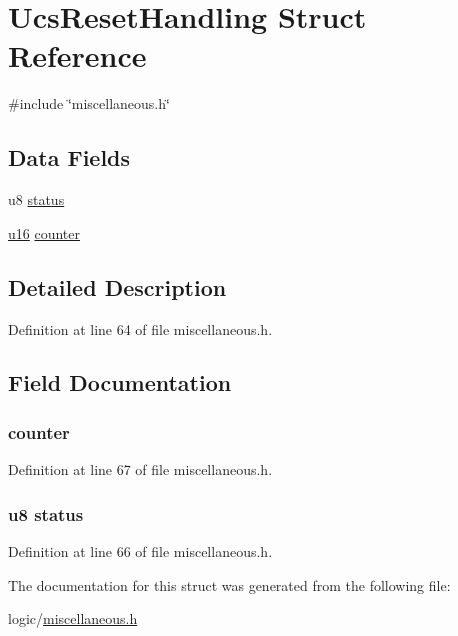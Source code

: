 \hypertarget{structUcsResetHandling}{\section{\-Ucs\-Reset\-Handling \-Struct \-Reference}
\label{structUcsResetHandling}
}


{\ttfamily \#include \char`\"{}miscellaneous.\-h\char`\"{}}

\subsection*{\-Data \-Fields}
\begin{DoxyCompactItemize}
\item 
u8 \hyperlink{structUcsResetHandling_aa648386576736be0dd25c95b6edd37d2}{status}
\item 
\hyperlink{main__ED__BM_8c_a9e6c91d77e24643b888dbd1a1a590054}{u16} \hyperlink{structUcsResetHandling_ad00d8d1e3945b2409706acf4fb49f3c1}{counter}
\end{DoxyCompactItemize}


\subsection{\-Detailed \-Description}


\-Definition at line 64 of file miscellaneous.\-h.



\subsection{\-Field \-Documentation}
\hypertarget{structUcsResetHandling_ad00d8d1e3945b2409706acf4fb49f3c1}{
\subsubsection[{counter}]{ {\bf counter}}}\label{structUcsResetHandling_ad00d8d1e3945b2409706acf4fb49f3c1}


\-Definition at line 67 of file miscellaneous.\-h.

\hypertarget{structUcsResetHandling_aa648386576736be0dd25c95b6edd37d2}{
\subsubsection[{status}]{\setlength{\rightskip}{0pt plus 5cm}u8 {\bf status}}}\label{structUcsResetHandling_aa648386576736be0dd25c95b6edd37d2}


\-Definition at line 66 of file miscellaneous.\-h.



\-The documentation for this struct was generated from the following file\-:\begin{DoxyCompactItemize}
\item 
logic/\hyperlink{miscellaneous_8h}{miscellaneous.\-h}\end{DoxyCompactItemize}

